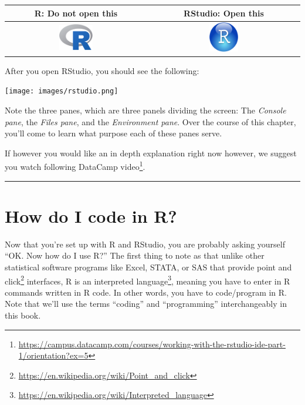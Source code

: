 \documentclass[12pt, krantz2,]{krantz}
\renewcommand{\href}[2]{#2\footnote{\url{#1}}}
\begin{document}
\begin{longtable}[]{@{}cc@{}}
\toprule
R: Do not open this & RStudio: Open this\tabularnewline
\midrule
\endhead
\includegraphics[width=0.25\textwidth,height=\textheight]{images/Rlogo.png} & \includegraphics[width=0.2\textwidth,height=\textheight]{images/RStudio-Ball.png}\tabularnewline
\bottomrule
\end{longtable}

After you open RStudio, you should see the following:

\texttt{[image: images/rstudio.png]}

Note the three panes, which are three panels dividing the screen: The \emph{Console pane}, the \emph{Files pane}, and the \emph{Environment pane}. Over the course of this chapter, you'll come to learn what purpose each of these panes serve.

If however you would like an in depth explanation right now however, we suggest you watch following \href{https://campus.datacamp.com/courses/working-with-the-rstudio-ide-part-1/orientation?ex=5}{DataCamp video}.

\begin{center}\rule{0.5\linewidth}{\linethickness}\end{center}

\hypertarget{code}{%
\section{How do I code in R?}\label{code}}

Now that you're set up with R and RStudio, you are probably asking yourself ``OK. Now how do I use R?'' The first thing to note as that unlike other statistical software programs like Excel, STATA, or SAS that provide \href{https://en.wikipedia.org/wiki/Point_and_click}{point and click} interfaces, R is an \href{https://en.wikipedia.org/wiki/Interpreted_language}{interpreted language}, meaning you have to enter in R commands written in R code. In other words, you have to code/program in R. Note that we'll use the terms ``coding'' and ``programming'' interchangeably in this book.
\end{document}
